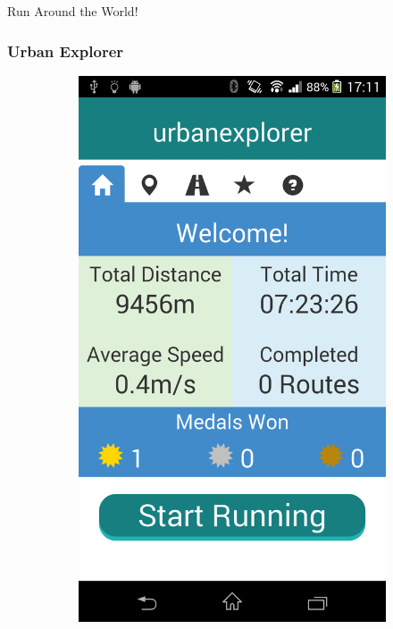 \documentclass{beamer}
\begin{document}
\begin{frame}
  \centering
  Run Around the World! 
  \frametitle{Urban Explorer}
    \begin{figure}[h]
    \centering
    \begin{subfigure}[b]{0.3\textwidth}
      \includegraphics[width=\textwidth]{images/home.png}
    \end{subfigure}
    \hspace{0.02\textwidth}
    \begin{subfigure}[b]{0.3\textwidth}

\end{subfigure}
\end{figure}
\end{frame}
\end{document}
